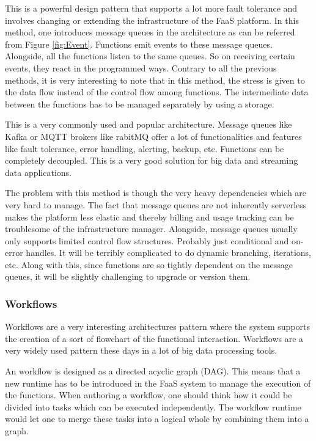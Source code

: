 \documentclass[12pt,titlepage]{article}
\begin{document}
This is a powerful design pattern that supports a lot more fault tolerance and
involves changing or extending the infrastructure of the FaaS platform. In this
method, one introduces message queues in the architecture as can be referred
from Figure \ref{fig:Event}. Functions emit events to these message queues. Alongside, all the
functions listen to the same queues. So on receiving certain events, they react
in the programmed ways. Contrary to all the previous methods, it is very
interesting to note that in this method, the stress is given to the data flow
instead of the control flow among functions. The intermediate data between the
functions has to be managed separately by using a storage.

This is a very commonly used and popular architecture. Message queues like Kafka
or MQTT brokers like rabitMQ offer a lot of functionalities and features like
fault tolerance, error handling, alerting, backup, etc. Functions can be
completely decoupled. This is a very good solution for big data and streaming
data applications.

The problem with this method is though the very heavy dependencies which are
very hard to manage. The fact that message queues are not inherently serverless
makes the platform less elastic and thereby billing and usage tracking can be
troublesome of the infrastructure manager. Alongside, message queues usually
only supports limited control flow structures. Probably just conditional and
on-error handles. It will be terribly complicated to do dynamic branching,
iterations, etc. Along with this, since functions are so tightly dependent on
the message queues, it will be slightly challenging to upgrade or version them.

\subsubsection{Workflows}
\label{sec:org6f90e98}

Workflows are a very interesting architectures pattern where the system supports
the creation of a sort of flowchart of the functional interaction. Workflows are
a very widely used pattern these days in a lot of big data processing tools.

An workflow is designed as a directed acyclic graph (DAG). This means that a new
runtime has to be introduced in the FaaS system to manage the execution of the
functions. When authoring a workflow, one should think how it could be divided
into tasks which can be executed independently. The workflow runtime would let
one to merge these tasks into a logical whole by combining them into a graph.
\end{document}
